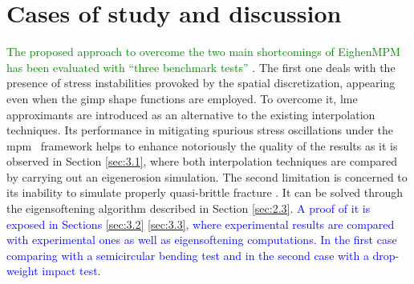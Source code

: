 \message{ !name(2020_EFM_MPM_Eigensoftening.tex)}\documentclass[preprint,12pt,a4paper]{elsarticle}
\newcommand{\MMP}[1]{
  \textcolor{blue}{{#1}}
}
\newcommand{\DM}[1]{
  \textcolor{green}{{#1}}
}
\begin{document}
\section{Cases of study and discussion}
\label{sec:3}

\DM{The proposed approach to overcome the two main shortcomings of
  EighenMPM \cite{Zhang_EE_2020} has been evaluated with ``three
  benchmark tests''}.
The first one deals with the presence of stress
instabilities provoked by the spatial discretization, appearing even when the \acrshort{gimp} shape functions are employed. To overcome it, \acrshort{lme}
approximants are introduced as an alternative to the existing interpolation techniques. Its
performance in mitigating spurious stress oscillations under the \acrshort{mpm}~\cite{Wobbes2020,Molinos2020} framework helps to enhance
notoriously the quality of the results as it is observed in Section
\ref{sec:3.1}, where both interpolation techniques
are compared by carrying out an eigenerosion simulation. The second
limitation is concerned to its inability to simulate properly quasi-brittle
fracture \cite{Navas_2018_ES}. It can be solved through the
eigensoftening algorithm described in Section \ref{sec:2.3}.\MMP{A proof
of it is exposed in Sections \ref{sec:3.2} \ref{sec:3.3}, where experimental results
are compared with experimental ones as well as eigensoftening
computations. In the first case comparing with a semicircular bending
test and in the second case with a drop-weight impact test.}
\end{document}
